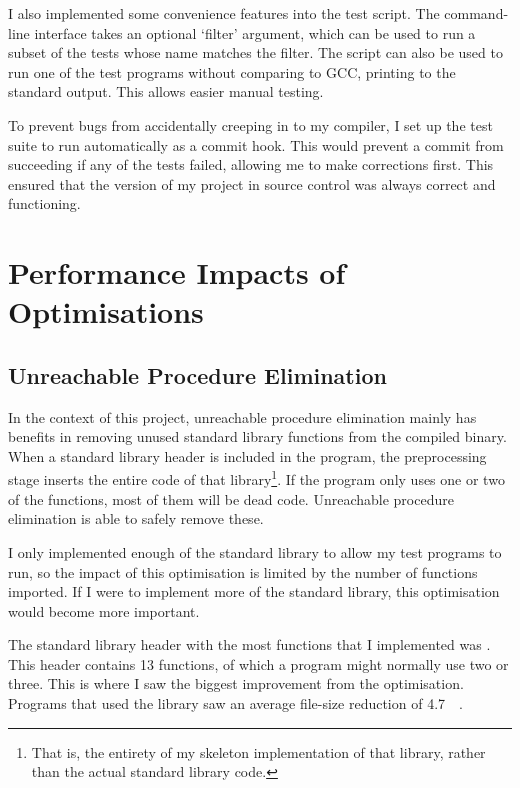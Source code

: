 \documentclass[00-main.tex]{subfiles}
\begin{document}
I also implemented some convenience features into the test script.
The command-line interface takes an optional `filter' argument, which can be used to run a subset of the tests whose name matches the filter.
The script can also be used to run one of the test programs without comparing to GCC, printing to the standard output. This allows easier manual testing.

To prevent bugs from accidentally creeping in to my compiler, I set up the test suite to run automatically as a commit hook. This would prevent a commit from succeeding if any of the tests failed, allowing me to make corrections first.
This ensured that the version of my project in source control was always correct and functioning.




\section{Performance Impacts of Optimisations}

\subsection{Unreachable Procedure Elimination}


In the context of this project, unreachable procedure elimination mainly has benefits in removing unused standard library functions from the compiled binary.
When a standard library header is included in the program, the preprocessing stage inserts the entire code of that library\footnote{That is, the entirety of my skeleton implementation of that library, rather than the actual standard library code.}.
If the program only uses one or two of the functions, most of them will be dead code.
Unreachable procedure elimination is able to safely remove these.

I only implemented enough of the standard library to allow my test programs to run, so the impact of this optimisation is limited by the number of functions imported.
If I were to implement more of the standard library, this optimisation would become more important.

The standard library header with the most functions that I implemented was .
This header contains 13 functions, of which a program might normally use two or three.
This is where I saw the biggest improvement from the optimisation.
Programs that used the  library saw an average file-size reduction of \SI{4.7}{\kilo\byte}.
\end{document}
